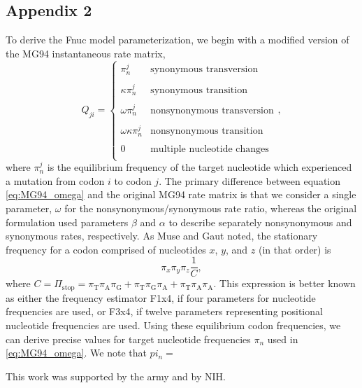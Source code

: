 \documentclass{pnastwo}
\begin{document}
\begin{article}
\section*{Appendix 2}
To derive the Fnuc model parameterization, we begin with a modified version of the MG94 \cite{MuseGaut1994} instantaneous rate matrix, 
\begin{equation}\label{eq:MG94_omega}
Q_{ji} = \left\{ 
\begin{array}{rl}
\pi_n^j                  &\mbox{synonymous transversion} \\\\
\kappa \pi_n^j           &\mbox{synonymous transition} \\\\
\omega \pi_n^j           &\mbox{nonsynonymous transversion} \\\\
\omega \kappa \pi_n^j    &\mbox{nonsynonymous transition} \\\\
0                        &\mbox{multiple nucleotide changes} \\           
\end{array} \right.,
\end{equation}
where $\pi_n^j$ is the equilibrium frequency of the target nucleotide which experienced a mutation from codon $i$ to codon $j$. The primary difference between equation \eqref{eq:MG94_omega} and the original MG94 rate matrix is that we consider a single parameter, $\omega$ for the nonsynonymous/synonymous rate ratio, whereas the original formulation used parameters $\beta$ and $\alpha$ to describe separately nonsynonymous and synonymous rates, respectively. As Muse and Gaut \cite{MuseGaut1994} noted, the stationary frequency for a codon comprised of nucleotides $x$, $y$, and $z$ (in that order) is
\begin{equation}\label{eq:F3x4}
\pi_x\pi_y\pi_z\frac{1}{C}, 
\end{equation}
where $C = \Pi_\text{stop} = \pi_\text{T}\pi_\text{A}\pi_\text{G} + \pi_\text{T}\pi_\text{G}\pi_\text{A} + \pi_\text{T}\pi_\text{A}\pi_\text{A}$. This expression \label{eq:F3x4} is better known as either the frequency estimator F1x4, if four parameters for nucleotide frequencies are used, or F3x4, if twelve parameters representing positional nucleotide frequencies are used.
Using these equilibrium codon frequencies, we can derive precise values for target nucleotide frequencies $\pi_n$ used in \eqref{eq:MG94_omega}. We note that 
$pi_n = $

		
\begin{acknowledgments}
	This work was supported by the army and by NIH.
\end{acknowledgments}
		

		
		


		
		
\end{article}
	
\end{document}

